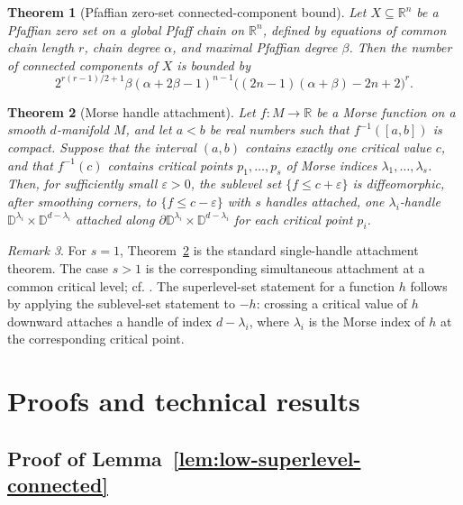 \documentclass[11pt]{article}
\theoremstyle{plain}
\newtheorem{theorem}{Theorem}[section]
\theoremstyle{definition}
\theoremstyle{remark}
\newtheorem{remark}[theorem]{Remark}
\numberwithin{equation}{section}
\newcommand{\R}{\mathbb{R}}
\begin{document}
\begin{theorem}[Pfaffian zero-set connected-component bound]\label{thm:GVcc}
Let $X\subseteq\R^n$ be a Pfaffian zero set on a global Pfaff chain on $\R^n$, defined by equations of common chain length $r$, chain degree $\alpha$, and maximal Pfaffian degree $\beta$. Then the number of connected components of $X$ is bounded by
\[
2^{r(r-1)/2+1}\beta(\alpha+2\beta-1)^{n-1}\bigl((2n-1)(\alpha+\beta)-2n+2\bigr)^r.
\]
\end{theorem}

\begin{theorem}[Morse handle attachment]\label{thm:morse-handle}
Let $f:M\to\R$ be a Morse function on a smooth $d$-manifold $M$, and let $a<b$ be real numbers such that $f^{-1}([a,b])$ is compact. Suppose that the interval $(a,b)$ contains exactly one critical value $c$, and that $f^{-1}(c)$ contains critical points $p_1,\dots,p_s$ of Morse indices $\lambda_1,\dots,\lambda_s$. Then, for sufficiently small $\varepsilon>0$, the sublevel set $\{f\le c+\varepsilon\}$ is diffeomorphic, after smoothing corners, to $\{f\le c-\varepsilon\}$ with $s$ handles attached, one $\lambda_i$-handle $\mathbb D^{\lambda_i}\times\mathbb D^{d-\lambda_i}$ attached along $\partial\mathbb D^{\lambda_i}\times\mathbb D^{d-\lambda_i}$ for each critical point $p_i$.
\end{theorem}

\begin{remark}
For $s=1$, Theorem~\ref{thm:morse-handle} is the standard single-handle attachment theorem. The case $s>1$ is the corresponding simultaneous attachment at a common critical level; cf. \citet[Remark~2.9]{Nicolaescu2011}. The superlevel-set statement for a function $h$ follows by applying the sublevel-set statement to $-h$: crossing a critical value of $h$ downward attaches a handle of index $d-\lambda_i$, where $\lambda_i$ is the Morse index of $h$ at the corresponding critical point.
\end{remark}

\section{Proofs and technical results}\label{app:deferred}


\subsection{Proof of Lemma~\ref{lem:low-superlevel-connected}}\label{subsec:low-superlevel-proof}
\end{document}
